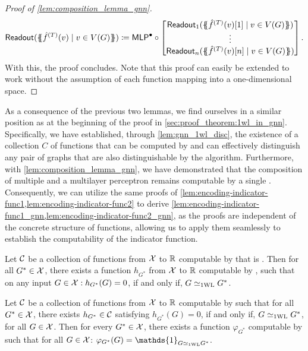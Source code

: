 \begin{proof}[Proof of \cref{lem:composition_lemma_gnn}]
    \begin{align*}
        \textsf{Readout}(\MSopen \hat{f}^{(T)}(v) \mid v \in V(G) \MSclose) \coloneqq \mlp^\bullet \circ \begin{bmatrix}
            \textsf{Readout}_1(\MSopen \hat{f}^{(T)}(v)[1] \mid v \in V(G) \MSclose)\\
            \vdots\\
            \textsf{Readout}_n(\MSopen \hat{f}^{(T)}(v)[n] \mid v \in V(G) \MSclose)
        \end{bmatrix}.
    \end{align*}
    With this, the proof concludes. Note that this proof can easily be extended to work without the assumption of each function mapping into a one-dimensional space.
\end{proof}

As a consequence of the previous two lemmas, we find ourselves in a similar position as at the beginning of the proof in \cref{sec:proof_theorem:1wl_in_gnn}. Specifically, we have established, through \cref{lem:gnn_1wl_disc}, the existence of a collection $C$ of functions that can be computed by \gnns and can effectively distinguish any pair of graphs that are also distinguishable by the \wl algorithm. Furthermore, with \cref{lem:composition_lemma_gnn}, we have demonstrated that the composition of multiple \gnns and a multilayer perceptron remains computable by a single \gnn. Consequently, we can utilize the same proofs of \cref{lem:encoding-indicator-func1,lem:encoding-indicator-func2} to derive \cref{lem:encoding-indicator-func1_gnn,lem:encoding-indicator-func2_gnn}, as the proofs are independent of the concrete structure of \wlnn functions, allowing us to apply them seamlessly to establish the \gnn computability of the indicator function.

\begin{corollary}\label{lem:encoding-indicator-func1_gnn}
    Let $\mathcal{C}$ be a collection of functions from $\mathcal{X}$ to $\mathbb{R}$ computable by \gnns that is \wldisc. Then for all $G^* \in \mathcal{X}$, there exists a function $h_{G^*}$ from $\mathcal{X}$ to $\mathbb{R}$ computable by \gnn, such that on any input $G \in \mathcal{X}: h_{G^*}(G) = 0$, if and only if, $G \simeq_{\text{1WL}} G^*$.
\end{corollary}
\begin{corollary}\label{lem:encoding-indicator-func2_gnn}
    Let $\mathcal{C}$ be a collection of functions from $\mathcal{X}$ to $\mathbb{R}$ computable by \gnns such that for all $G^* \in \mathcal{X}$, there exists $h_{G^*} \in \mathcal{C}$ satisfying $h_{G^*}(G) = 0 $, if and only if, $G \simeq_{\text{1WL}} G^*$, for all $G \in \mathcal{X}$. Then for every $G^* \in \mathcal{X}$, there exists a function $\varphi_{G^*} $ computable by \gnns such that for all $G \in \mathcal{X}$: $\varphi_{G^*}(G) = \mathds{1}_{G \wliso G^*}$.
\end{corollary}

